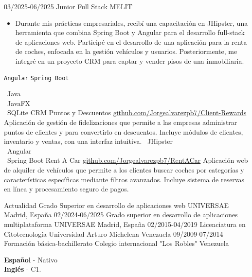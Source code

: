\documentclass[9pt]{./src/developercv} %
\begin{document}
\vspace{10 pt}
\begin{entrylist}
	\entry
	{03/2025-06/2025}
	{Junior Full Stack}
	{MELIT}
	{\vspace{-10pt}
		\begin{itemize}[noitemsep,topsep=0pt,parsep=0pt,partopsep=0pt, leftmargin=-1pt]
			\item {Durante mis prácticas empresariales, recibí una capacitación en JHipster, una herramienta que combina Spring Boot y Angular para el desarrollo full-stack de aplicaciones web. Participé en el desarrollo de una aplicación para la renta de coches, enfocada en la gestión vehículos y usuarios. Posteriormente, me integré en un proyecto CRM para captar y vender pisos de una inmobiliaria.}
		\end{itemize}
		\texttt{Angular} \slashsep \texttt{Spring Boot}}
\end{entrylist}

\begin{entrylist}
	\entry
	{ \textbullet\ Java \\ \textbullet\ JavaFX \\ \textbullet\ SQLite}
	{CRM Puntos y Descuentos}
	{\href {https://github.com/Jorgealvarezpb7/Client-Rewards}          {github.com/Jorgealvarezpb7/Client-Rewards}}
	{Aplicación de gestión de fidelizaciones que permite a las empresas administrar puntos de clientes y para convertirlo en descuentos. Incluye módulos de clientes, inventario y ventas, con una interfaz intuitiva.}
	\entry
	{ \textbullet\ JHipster \\ \textbullet\ Angular \\ \textbullet\ Spring Boot}
	{Rent A Car}
	{\href {https://github.com/Jorgealvarezpb7/RentACar}          {github.com/Jorgealvarezpb7/RentACar}}
	{Aplicación web de alquiler de vehículos que permite a los clientes buscar coches por categorías y características específicas mediante filtros avanzados. Incluye sistema de reservas en línea y procesamiento seguro de pagos.}
\end{entrylist}

\vspace{-10 pt}
\begin{entrylist}
	\entry
	{Actualidad}
	{Grado Superior en desarrollo de aplicaciones web}
	{UNIVERSAE}
	{Madrid, España}
	\entry
	{02/2024-06/2025}
	{Grado superior en desarrollo de aplicaciones multiplataforma}
	{UNIVERSAE}
	{Madrid, España}
	\entry
	{02/2015-04/2019}
	{Licenciatura en Citotecnología}
	{Universidad Arturo Michelena}
	{Venezuela}
	\entry
	{09/2009-07/2014}
	{Formación básica-bachillerato}
	{Colegio internacional "Los Robles"}
	{Venezuela}
\end{entrylist}

\vspace{-10 pt}
\vspace{-6pt}

\textbf{Español} - Nativo \\
\textbf{Inglés} - C1.
\end{document}
